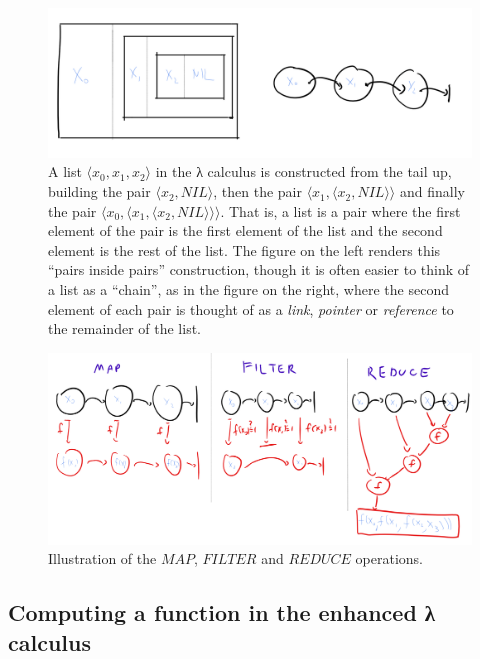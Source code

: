\begin{figure}
\centering
\includegraphics[width=\textwidth, height=0.25\paperheight, keepaspectratio]{../figure/lambdalist.png}
\caption{A list \(\langle x_0,x_1,x_2 \rangle\) in the λ calculus is
constructed from the tail up, building the pair
\(\langle x_2,\ensuremath{\mathit{NIL}}\rangle\), then the pair
\(\langle x_1, \langle x_2,\ensuremath{\mathit{NIL}}\rangle \rangle\)
and finally the pair
\(\langle x_0,\langle x_1,\langle x_2,\ensuremath{\mathit{NIL}} \rangle\rangle\rangle\).
That is, a list is a pair where the first element of the pair is the
first element of the list and the second element is the rest of the
list. The figure on the left renders this ``pairs inside pairs''
construction, though it is often easier to think of a list as a
``chain'', as in the figure on the right, where the second element of
each pair is thought of as a \emph{link}, \emph{pointer} or
\emph{reference} to the remainder of the list.}
\label{lambdalistfig}
\end{figure}


\begin{figure}
\centering
\includegraphics[width=\textwidth, height=0.25\paperheight, keepaspectratio]{../figure/reducemapfilter.png}
\caption{Illustration of the \(\ensuremath{\mathit{MAP}}\),
\(\ensuremath{\mathit{FILTER}}\) and \(\ensuremath{\mathit{REDUCE}}\)
operations.}
\label{reduceetalfig}
\end{figure}

\subsection{Computing a function in the enhanced λ
calculus}\label{Computing-a-function-in-t}

